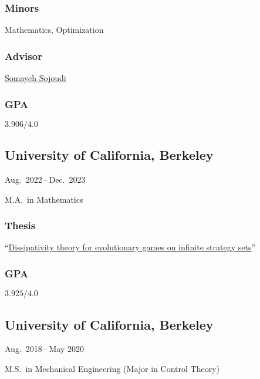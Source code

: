 \documentclass[11pt]{article}
\newcommand{\sectionwidth}{1in}		%
\newcommand{\subsectionskip}{\baselineskip}	%
\newcommand{\cvdates}[2]{\hfill#1\,--\,#2}	%
\begin{document}
	\subsubsection{Minors}
	Mathematics, Optimization
	
	\subsubsection{Advisor}
	\href{https://people.eecs.berkeley.edu/~sojoudi/}{Somayeh Sojoudi}
	
	\begin{gpa-on}
		\subsubsection{GPA}
		$3.906/4.0$
	\end{gpa-on}
	
	\vspace*{\subsectionskip}

	\subsection{University of California, Berkeley}
	\cvdates{Aug.\ 2022}{Dec.\ 2023}

	\hspace*{\sectionwidth}M.A.\ in Mathematics

	\subsubsection{Thesis}
	``\href{https://brendon-anderson.github.io/files/publications/ma_thesis.pdf}{Dissipativity theory for evolutionary games on infinite strategy sets}''

	\begin{gpa-on}
		\subsubsection{GPA}
		$3.925/4.0$
	\end{gpa-on}

	\vspace*{\subsectionskip}
	
	\subsection{University of California, Berkeley}
	\cvdates{Aug.\ 2018}{May 2020}
	
	\hspace*{\sectionwidth}M.S.\ in Mechanical Engineering (Major in Control Theory)
	
\end{document}
